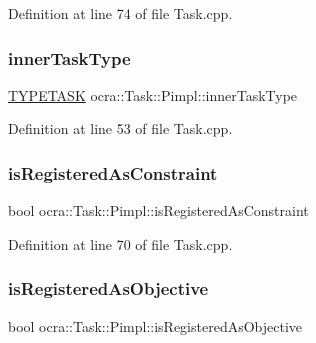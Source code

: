 Definition at line 74 of file Task.\+cpp.

\hypertarget{structocra_1_1Task_1_1Pimpl_a576a2ffd53c10013b395d3430fe487ed}{}\label{structocra_1_1Task_1_1Pimpl_a576a2ffd53c10013b395d3430fe487ed} 
\subsubsection{\texorpdfstring{inner\+Task\+Type}{innerTaskType}}
{\footnotesize\ttfamily \hyperlink{classocra_1_1Task_ad9d224cf787aa61c098f282efb78254a}{T\+Y\+P\+E\+T\+A\+SK} ocra\+::\+Task\+::\+Pimpl\+::inner\+Task\+Type}



Definition at line 53 of file Task.\+cpp.

\hypertarget{structocra_1_1Task_1_1Pimpl_ae028c89ba97335288e09cf823399f680}{}\label{structocra_1_1Task_1_1Pimpl_ae028c89ba97335288e09cf823399f680} 
\subsubsection{\texorpdfstring{is\+Registered\+As\+Constraint}{isRegisteredAsConstraint}}
{\footnotesize\ttfamily bool ocra\+::\+Task\+::\+Pimpl\+::is\+Registered\+As\+Constraint}



Definition at line 70 of file Task.\+cpp.

\hypertarget{structocra_1_1Task_1_1Pimpl_a15289fedace1e80a0999cec502b60d23}{}\label{structocra_1_1Task_1_1Pimpl_a15289fedace1e80a0999cec502b60d23} 
\subsubsection{\texorpdfstring{is\+Registered\+As\+Objective}{isRegisteredAsObjective}}
{\footnotesize\ttfamily bool ocra\+::\+Task\+::\+Pimpl\+::is\+Registered\+As\+Objective}



